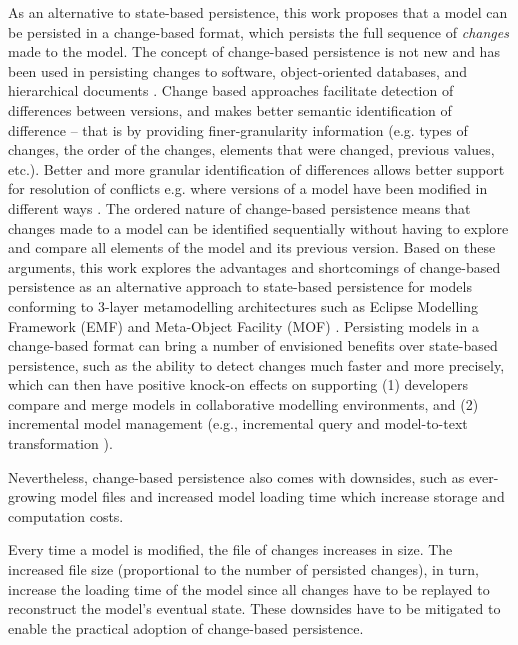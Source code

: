 As an alternative to state-based persistence, this work proposes that a model can be persisted in a change-based format, 
which persists the full sequence of \emph{changes} made to the model. 
The concept of change-based persistence is not new and has been used in persisting changes to software, 
object-oriented databases, and hierarchical documents 
\cite{DBLP:journals/entcs/RobbesL07,DBLP:conf/sde/LippeO92,DBLP:conf/caise/IgnatN05}. Change based approaches facilitate detection of differences between versions, and makes better semantic identification of difference -- that is by providing finer-granularity information (e.g. types of changes, the order of the changes, elements that were changed, previous values, etc.).  Better and more granular identification of differences allows better support for resolution of conflicts e.g. where versions of a model have been modified in different ways \cite{mens2002state}. 
The ordered nature of change-based persistence means that changes made to a model can be identified sequentially without having to explore and compare all elements of the model and its previous version. Based on these arguments, 
this work explores the advantages and shortcomings of change-based persistence as an alternative approach to state-based persistence for models conforming to 3-layer metamodelling architectures such as Eclipse Modelling Framework (EMF) \cite{eclipse2019emf} and Meta-Object Facility (MOF) \cite{omg2018mof}. Persisting models in a change-based format can bring a number of envisioned benefits over state-based persistence, 
such as the ability to detect changes much faster and more precisely, which can then have positive 
knock-on effects on supporting (1) developers compare and merge models in collaborative modelling environments, 
and (2) incremental model management (e.g., incremental query \cite{DBLP:conf/ecmdafa/RathHV12} and 
model-to-text transformation \cite{DBLP:conf/ecmdafa/OgunyomiRK15}). 

Nevertheless, change-based persistence also comes with downsides, such as ever-growing model files 
\cite{DBLP:journals/entcs/RobbesL07,DBLP:conf/edoc/KoegelHLHD10} and increased model loading time \cite{mens2002state}
which increase storage and computation costs. 

Every time a model is modified, the file of changes increases in size. The increased file size (proportional to the number of persisted changes), 
in turn, increase the loading time of the model since all changes have to be replayed to reconstruct the model's 
eventual state. These downsides have to be mitigated to enable the practical adoption of change-based persistence. 

